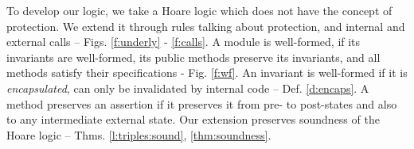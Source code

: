 To develop our logic, we   take  a  Hoare logic %
which does not {have} the concept of protection.
We  extend it through %
rules talking about protection, and internal and external calls 
-- \cf Figs. \ref{f:underly} -  \ref{f:calls}. %
A module is well-formed, if  its invariants are well-formed,    its public methods preserve   its invariants, and  all  methods satisfy their specifications - \cf  Fig.  \ref{f:wf}.
An invariant is well-formed if   it is \emph{encapsulated}, \ie can only be invalidated by internal code
-- \cf Def. \ref{d:encaps}. 
A method preserves an assertion   if it preserves it   from pre- to  post-states and also to any intermediate external state.
 Our extension preserves soundness of the  Hoare logic --  \cf   
 Thms.  \ref{l:triples:sound},  \ref{thm:soundness}.





